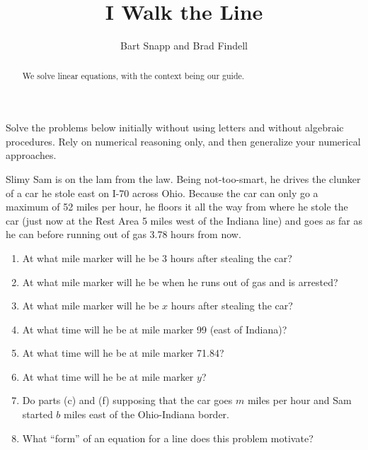 \documentclass[nooutcomes]{ximera}
\title{I Walk the Line}
\author{Bart Snapp and Brad Findell}
\begin{document}
\begin{abstract}
  We solve linear equations, with the context being our guide.
\end{abstract}
\maketitle

\label{A:walk}
Solve the problems below initially without using letters and without algebraic procedures.  Rely on numerical reasoning only, and then generalize your numerical approaches.  

\begin{problem}
Slimy Sam is on the lam from the law.  Being not-too-smart, he drives
the clunker of a car he stole east on I-70 across Ohio.  Because the
car can only go a maximum of 52 miles per hour, he floors it all the
way from where he stole the car (just now at the Rest Area 5 miles
west of the Indiana line) and goes as far as he can before running out
of gas 3.78 hours from now.

\begin{enumerate}
\item At what mile marker will he be 3 hours after stealing the car?
\item At what mile marker will he be when he runs out of gas and is
  arrested?
\item At what mile marker will he be $x$ hours after
  stealing the car?
\item At what time will he be at mile marker 99 (east of Indiana)?
\item At what time will he be at mile marker 71.84?
\item At what time will he be at mile marker $y$?
\item Do parts (c) and (f) supposing that the car
  goes $m$ miles per hour and Sam started $b$ miles east of the
  Ohio-Indiana border.
\item What ``form'' of an equation for a line does this problem
  motivate?
\end{enumerate}
\end{problem}
\end{document}
